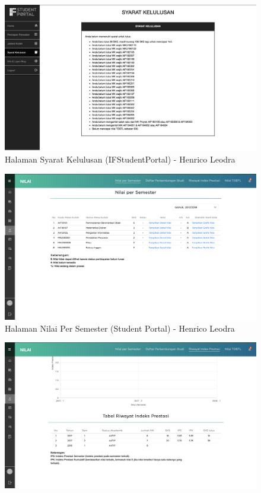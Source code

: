 \begin{itemize}
\begin{enumerate}
		\begin{figure}[H]
			\centering
			\includegraphics[scale=0.325]{Gambar/HasilPengujian/2017_2_syarat_kelulusan_ifstudentportal}
			\caption{Halaman Syarat Kelulusan (IFStudentPortal) - Henrico Leodra}
			\label{fig:2017_2_syarat_kelulusan_ifstudentportal}
		\end{figure}
		\begin{figure}[H]
			\centering
			\includegraphics[scale=0.325]{Gambar/HasilPengujian/2017_2_nps_studentportal}
			\caption{Halaman Nilai Per Semester (Student Portal) - Henrico Leodra}
			\label{fig:2017_2_nps_studentportal}
		\end{figure}
		\begin{figure}[H]
			\centering
			\includegraphics[scale=0.325]{Gambar/HasilPengujian/2017_2_rip_studentportal}

\end{figure}
\end{enumerate}
\end{itemize}
